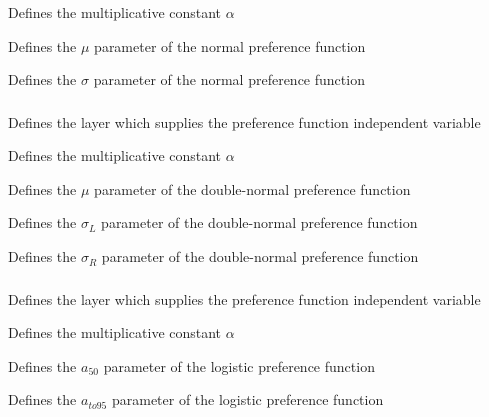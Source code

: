  {Defines the multiplicative constant $\alpha$}

 {Defines the $\mu$ parameter of the normal preference function}

 {Defines the $\sigma$ parameter of the normal preference function}

\subsubsection[Double-normal]{}

 {Defines the layer which supplies the preference function independent variable}

 {Defines the multiplicative constant $\alpha$}

 {Defines the $\mu$ parameter of the double-normal preference function}

 {Defines the $\sigma_L$ parameter of the double-normal preference function}

 {Defines the $\sigma_R$ parameter of the double-normal preference function}

\subsubsection[Logistic]{}

 {Defines the layer which supplies the preference function independent variable}

 {Defines the multiplicative constant $\alpha$}

 {Defines the $a_{50}$ parameter of the logistic preference function}

 {Defines the $a_{to95}$ parameter of the logistic preference function}

